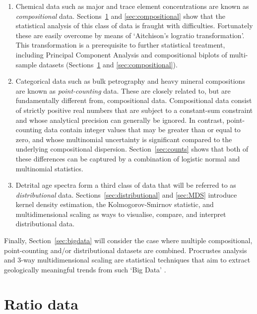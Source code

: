 \documentclass[11pt]{article}
\begin{document}
\begin{enumerate}
  
\item Chemical data such as major and trace element concentrations are
  known as \emph{compositional} data. Sections~\ref{sec:ratios} and
  \ref{sec:compositional} show that the statistical analysis of this
  class of data is fraught with difficulties. Fortunately these are
  easily overcome by means of `Aitchison's logratio
  transformation'. This transformation is a prerequisite to further
  statistical treatment, including Principal Component Analysis and
  compositional biplots of multi-sample datasets
  (Sections~\ref{sec:ratios} and \ref{sec:compositional}).

\item Categorical data such as bulk petrography and heavy mineral
  compositions are known as \emph{point-counting} data. These are
  closely related to, but are fundamentally different from,
  compositional data. Compositional data consist of strictly positive
  real numbers that are subject to a constant-sum constraint and whose
  analytical precision can generally be ignored. In contrast,
  point-counting data contain integer values that may be greater than
  or equal to zero, and whose multinomial uncertainty is significant
  compared to the underlying compositional
  dispersion. Section~\ref{sec:counts} shows that both of these
  differences can be captured by a combination of logistic normal and
  multinomial statistics.

\item Detrital age spectra form a third class of data that will be
  referred to as \emph{distributional} data.
  Sections~\ref{sec:distributional} and \ref{sec:MDS} introduce kernel
  density estimation, the Kolmogorov-Smirnov statistic, and
  multidimensional scaling as ways to visualise, compare, and
  interpret distributional data.

\end{enumerate}

Finally, Section~\ref{sec:bigdata} will consider the case where
multiple compositional, point-counting and/or distributional datasets
are combined. Procrustes analysis and 3-way multidimensional scaling
are statistical techniques that aim to extract geologically meaningful
trends from such `Big Data' \citep{vermeesch2015}.

\section{Ratio data}
\label{sec:ratios}
\end{document}
